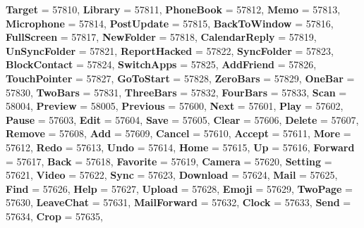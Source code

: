 \begin{DoxyCompactItemize}
{\bfseries Target} = 57810, 
\newline
{\bfseries Library} = 57811, 
{\bfseries Phone\+Book} = 57812, 
{\bfseries Memo} = 57813, 
{\bfseries Microphone} = 57814, 
\newline
{\bfseries Post\+Update} = 57815, 
{\bfseries Back\+To\+Window} = 57816, 
{\bfseries Full\+Screen} = 57817, 
{\bfseries New\+Folder} = 57818, 
\newline
{\bfseries Calendar\+Reply} = 57819, 
{\bfseries Un\+Sync\+Folder} = 57821, 
{\bfseries Report\+Hacked} = 57822, 
{\bfseries Sync\+Folder} = 57823, 
\newline
{\bfseries Block\+Contact} = 57824, 
{\bfseries Switch\+Apps} = 57825, 
{\bfseries Add\+Friend} = 57826, 
{\bfseries Touch\+Pointer} = 57827, 
\newline
{\bfseries Go\+To\+Start} = 57828, 
{\bfseries Zero\+Bars} = 57829, 
{\bfseries One\+Bar} = 57830, 
{\bfseries Two\+Bars} = 57831, 
\newline
{\bfseries Three\+Bars} = 57832, 
{\bfseries Four\+Bars} = 57833, 
{\bfseries Scan} = 58004, 
{\bfseries Preview} = 58005, 
\newline
{\bfseries Previous} = 57600, 
{\bfseries Next} = 57601, 
{\bfseries Play} = 57602, 
{\bfseries Pause} = 57603, 
\newline
{\bfseries Edit} = 57604, 
{\bfseries Save} = 57605, 
{\bfseries Clear} = 57606, 
{\bfseries Delete} = 57607, 
\newline
{\bfseries Remove} = 57608, 
{\bfseries Add} = 57609, 
{\bfseries Cancel} = 57610, 
{\bfseries Accept} = 57611, 
\newline
{\bfseries More} = 57612, 
{\bfseries Redo} = 57613, 
{\bfseries Undo} = 57614, 
{\bfseries Home} = 57615, 
\newline
{\bfseries Up} = 57616, 
{\bfseries Forward} = 57617, 
{\bfseries Back} = 57618, 
{\bfseries Favorite} = 57619, 
\newline
{\bfseries Camera} = 57620, 
{\bfseries Setting} = 57621, 
{\bfseries Video} = 57622, 
{\bfseries Sync} = 57623, 
\newline
{\bfseries Download} = 57624, 
{\bfseries Mail} = 57625, 
{\bfseries Find} = 57626, 
{\bfseries Help} = 57627, 
\newline
{\bfseries Upload} = 57628, 
{\bfseries Emoji} = 57629, 
{\bfseries Two\+Page} = 57630, 
{\bfseries Leave\+Chat} = 57631, 
\newline
{\bfseries Mail\+Forward} = 57632, 
{\bfseries Clock} = 57633, 
{\bfseries Send} = 57634, 
{\bfseries Crop} = 57635, 

\end{DoxyCompactItemize}
